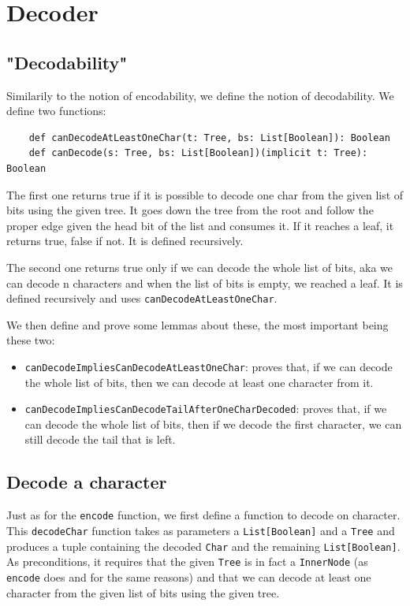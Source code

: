 \documentclass[a4paper,UKenglish,cleveref, autoref, thm-restate]{lipics-v2021}
\begin{document}
\section{Decoder}

\subsection{"Decodability"}
Similarily to the notion of encodability, we define the notion of decodability. We define two functions:
\begin{lstlisting}
    def canDecodeAtLeastOneChar(t: Tree, bs: List[Boolean]): Boolean
    def canDecode(s: Tree, bs: List[Boolean])(implicit t: Tree): Boolean
\end{lstlisting}

The first one returns true if it is possible to decode one char from the given list of bits using the given tree. 
It goes down the tree from the root and follow the proper edge given the head bit of the list and consumes it. If it reaches a leaf, it returns true, false if not. It is defined recursively.

The second one returns true only if we can decode the whole list of bits, aka we can decode n characters and when the list of bits is empty, we reached a leaf. It is defined recursively and uses \lstinline{canDecodeAtLeastOneChar}.

We then define and prove some lemmas about these, the most important being these two:
\begin{itemize}
    \item \lstinline{canDecodeImpliesCanDecodeAtLeastOneChar}: proves that, if we can decode the whole list of bits, then we can decode at least one character from it.
    \item \lstinline{canDecodeImpliesCanDecodeTailAfterOneCharDecoded}: proves that, if we can decode the whole list of bits, then if we decode the first character, we can still decode the tail that is left.
\end{itemize}

\subsection{Decode a character}
Just as for the \lstinline{encode} function, we first define a function to decode on character. This \lstinline{decodeChar} function takes as parameters a \lstinline{List[Boolean]} and 
a \lstinline{Tree} and produces a tuple containing the decoded \lstinline{Char} and the remaining \lstinline{List[Boolean]}.
As preconditions, it requires that the given \lstinline{Tree} is in fact a \lstinline{InnerNode} (as \lstinline{encode} does and for the same reasons) and that we can decode at least one character from the given list of bits using the given tree.
\end{document}
